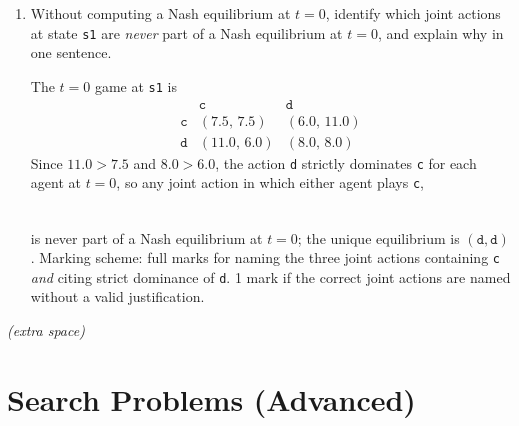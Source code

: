 \begin{enumerate}
\begin{table}[H]
\begin{tabular}{|c|c|c|c|c|}
\end{tabular}
\end{table}
\begin{solution}
Using
\[
q_1^*(s,a;0)=r_1(s,a)+\sum_{s'} p(s'\mid s,a)\,v_1^*(s';1),
\]
with
\[
v_1^*(\texttt{s1};1)=2,\qquad v_1^*(\texttt{s2};1)=7,
\]
we get:
\[
q_1^*(\texttt{s1},\texttt{c,c};0)=4+0.7(2)+0.3(7)=4+1.4+2.1=7.5,
\]
\[
q_1^*(\texttt{s1},\texttt{c,d};0)=1+0.4(2)+0.6(7)=1+0.8+4.2=6.0,
\]
\[
q_1^*(\texttt{s1},\texttt{d,c};0)=6+0.4(2)+0.6(7)=6+0.8+4.2=11.0,
\]
\[
q_1^*(\texttt{s1},\texttt{d,d};0)=2+0.2(2)+0.8(7)=2+0.4+5.6=8.0,
\]
\[
q_1^*(\texttt{s2},\texttt{c,c};0)=7+0.1(2)+0.9(7)=7+0.2+6.3=13.5,
\]
\[
q_1^*(\texttt{s2},\texttt{c,d};0)=2+0.5(2)+0.5(7)=2+1+3.5=6.5,
\]
\[
q_1^*(\texttt{s2},\texttt{d,c};0)=2+0.5(2)+0.5(7)=2+1+3.5=6.5,
\]
\[
q_1^*(\texttt{s2},\texttt{d,d};0)=7+0.2(2)+0.8(7)=7+1.4+1.6=10.0.
\]
\end{solution}
\clearpage
\item \points[2]
Without computing a Nash equilibrium at $t=0$, identify which joint actions at state
\texttt{s1} are \emph{never} part of a Nash equilibrium at $t=0$, and explain why in one
sentence.
\begin{solution}
The $t=0$ game at \texttt{s1} is
\[
\begin{array}{c|cc}
 & \texttt{c} & \texttt{d}\\\hline
\texttt{c} & (7.5,\,7.5) & (6.0,\,11.0)\\
\texttt{d} & (11.0,\,6.0) & (8.0,\,8.0)
\end{array}
\]
Since $11.0 > 7.5$ and $8.0 > 6.0$, the action \texttt{d} strictly dominates \texttt{c} for
each agent at $t=0$, so any joint action in which either agent plays \texttt{c},
\[
\ansnt{(\texttt{c},\texttt{c}),\;(\texttt{c},\texttt{d}),\;\text{and}\;(\texttt{d},\texttt{c})}
\]
is never part of a Nash equilibrium at $t=0$; the unique equilibrium is $(\texttt{d},\texttt{d})$.
\medskip
\noindent Marking scheme: full marks for naming the three joint actions containing \texttt{c}
\emph{and} citing strict dominance of \texttt{d}. 1 mark if the correct joint actions are named
without a valid justification.
\end{solution}
\vspace{60pt}
\end{enumerate}
\clearpage
\begin{center}
    \textit{(extra space)}
\end{center}
\clearpage
\section{\points[10] Search Problems (Advanced)}
